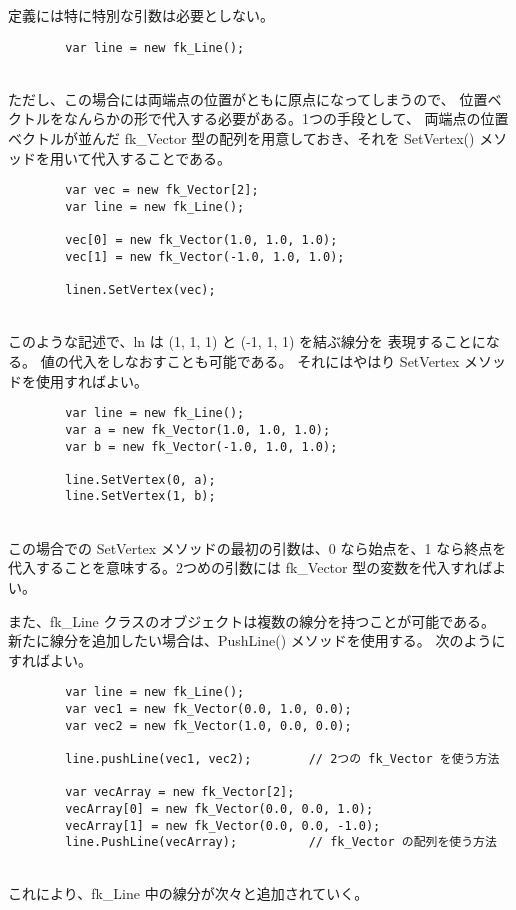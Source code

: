 定義には特に特別な引数は必要としない。
\\
\begin{screen}
\begin{verbatim}
        var line = new fk_Line();
\end{verbatim}
\end{screen}
~ \\
ただし、この場合には両端点の位置がともに原点になってしまうので、
位置ベクトルをなんらかの形で代入する必要がある。1つの手段として、
両端点の位置ベクトルが並んだ fk\_Vector 型の配列を用意しておき、それを
SetVertex() メソッドを用いて代入することである。
\\
\begin{breakbox}
\begin{verbatim}
        var vec = new fk_Vector[2];
        var line = new fk_Line();

        vec[0] = new fk_Vector(1.0, 1.0, 1.0);
        vec[1] = new fk_Vector(-1.0, 1.0, 1.0);

        linen.SetVertex(vec);
\end{verbatim}
\end{breakbox}
~ \\
このような記述で、ln は (1, 1, 1) と (-1, 1, 1) を結ぶ線分を
表現することになる。
値の代入をしなおすことも可能である。
それにはやはり SetVertex メソッドを使用すればよい。
\\
\begin{breakbox}
\begin{verbatim}
        var line = new fk_Line();
        var a = new fk_Vector(1.0, 1.0, 1.0);
        var b = new fk_Vector(-1.0, 1.0, 1.0);

        line.SetVertex(0, a);
        line.SetVertex(1, b);
\end{verbatim}
\end{breakbox}
~ \\
この場合での SetVertex メソッドの最初の引数は、0 なら始点を、1 なら終点を
代入することを意味する。2つめの引数には fk\_Vector 型の変数を代入すればよい。

また、fk\_Line クラスのオブジェクトは複数の線分を持つことが可能である。
新たに線分を追加したい場合は、PushLine() メソッドを使用する。
次のようにすればよい。
\\
\begin{breakbox}
\begin{verbatim}
        var line = new fk_Line();
        var vec1 = new fk_Vector(0.0, 1.0, 0.0);
        var vec2 = new fk_Vector(1.0, 0.0, 0.0);

        line.pushLine(vec1, vec2);        // 2つの fk_Vector を使う方法

        var vecArray = new fk_Vector[2];
        vecArray[0] = new fk_Vector(0.0, 0.0, 1.0);
        vecArray[1] = new fk_Vector(0.0, 0.0, -1.0);
        line.PushLine(vecArray);          // fk_Vector の配列を使う方法
\end{verbatim}
\end{breakbox}
~ \\
これにより、fk\_Line 中の線分が次々と追加されていく。

